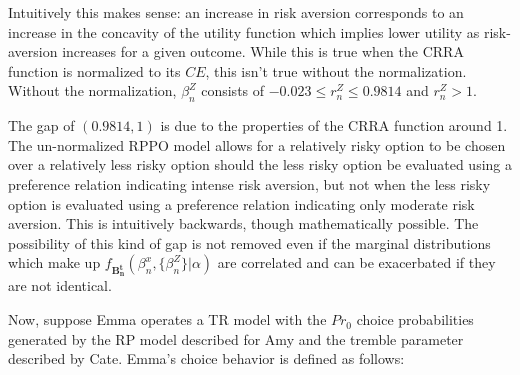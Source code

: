 \documentclass[11pt,a4paper]{article}
\newcommand\CE{\ensuremath{\mathit{CE}}}  %
\newcommand\Prob{\ensuremath{\mathit{Pr}}}  %
\begin{document}
Intuitively this makes sense: an increase in risk aversion corresponds to an increase in the concavity of the utility function which implies lower utility as risk-aversion increases for a given outcome.
While this is true when the CRRA function is normalized to its {\CE}, this isn't true without the normalization.
Without the normalization, $\beta_n^Z$ consists of $-0.023 \leq r_n^Z \leq 0.9814$ and $r_n^Z > 1$.

The gap of $(0.9814,1)$ is due to the properties of the CRRA function around 1.
The un-normalized RPPO model allows for a relatively risky option to be chosen over a relatively less risky option should the less risky option be evaluated using a preference relation indicating intense risk aversion, but not when the less risky option is evaluated using a preference relation indicating only moderate risk aversion.
This is intuitively backwards, though mathematically possible.
The possibility of this kind of gap is not removed even if the marginal distributions which make up $f_{\mathbf{B^t_n}}(\beta_n^x,\{\beta_n^Z\}|\alpha)$ are correlated and can be exacerbated if they are not identical.

Now, suppose Emma operates a TR model with the ${\Prob}_0$ choice probabilities generated by the RP model described for Amy and the tremble parameter described by Cate.
Emma's choice behavior is defined as follows:
\end{document}
